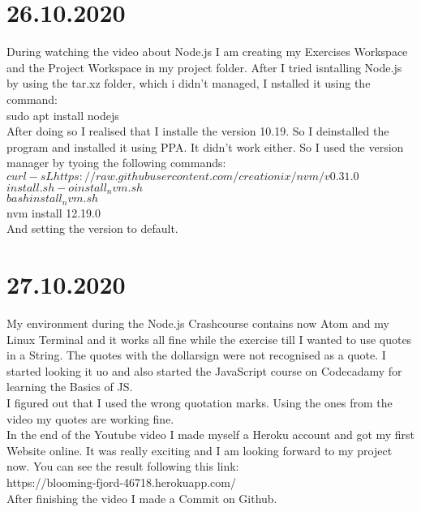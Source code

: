 \documentclass{article}
\begin{document}
\section{26.10.2020}
During watching the video about Node.js I am creating my Exercises Workspace and the Project Workspace in my project folder. 
After I tried isntalling Node.js by using the tar.xz folder, which i didn't managed, I nstalled it using the command:\\
sudo apt install nodejs\\
After doing so I realised that I installe the version 10.19. So I deinstalled the program and installed it using PPA. It didn't work either. So I used the version manager by tyoing the following commands:\\
$curl -sL https://raw.githubusercontent.com/creationix/nvm/v0.31.0$
$install.sh -o install_nvm.sh$\\
$bash install_nvm.sh$\\
nvm install 12.19.0\\
And setting the version to default.

\section{27.10.2020} 
My environment during the Node.js Crashcourse contains now Atom and my Linux Terminal and it works all fine while the exercise till I wanted to use quotes in a String. The quotes with the dollarsign were not recognised as a quote. I started looking it uo and also started the JavaScript course on Codecadamy for learning the Basics of JS.\\
I figured out that I used the wrong quotation marks. Using the ones from the video my quotes are working fine.\\
In the end of the Youtube video I made myself a Heroku account and got my first Website online. It was really exciting and I am looking forward to my project now. You can see the result following this link:\\
https://blooming-fjord-46718.herokuapp.com/\\
After finishing the video I made a Commit on Github.


\pagebreak 
%
\end{document}

